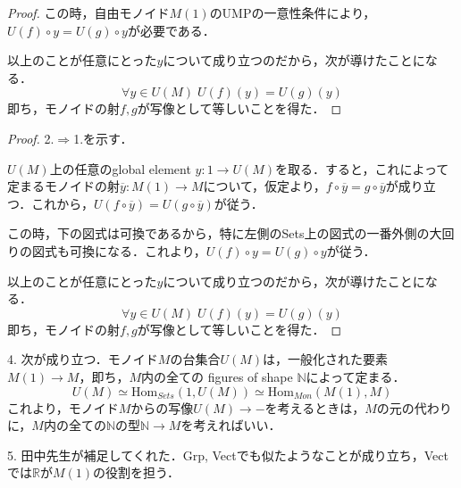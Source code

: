 \documentclass[uplatex, dvipdfmx]{jsarticle}
\begin{document}
\begin{example}
\begin{proof}
        この時，自由モノイド$M(1)$のUMPの一意性条件により，$U(f)\circ y=U(g)\circ y$が必要である．

        以上のことが任意にとった$y$について成り立つのだから，次が導けたことになる．
        \[\forall y\in U(M)\; U(f)(y)=U(g)(y) \]
        即ち，モノイドの射$f,g$が写像として等しいことを得た．
    \end{proof}
    \begin{proof}
        2.$\Rightarrow$1.を示す．
        
        $U(M)$上の任意のglobal element $y:1\to U(M)$を取る．すると，これによって定まるモノイドの射$\overline{y}:M(1)\to M$について，仮定より，$f\circ \overline{y}=g\circ\overline{y}$が成り立つ．これから，$U(f\circ\overline{y})=U(g\circ\overline{y})$が従う．
        
        この時，下の図式は可換であるから，特に左側のSets上の図式の一番外側の大回りの図式も可換になる．これより，$U(f)\circ y=U(g)\circ y$が従う．
        \begin{center}
        \end{center}

        以上のことが任意にとった$y$について成り立つのだから，次が導けたことになる．
        \[\forall y\in U(M)\; U(f)(y)=U(g)(y) \]
        即ち，モノイドの射$f,g$が写像として等しいことを得た．
    \end{proof}

    4. 次が成り立つ．モノイド$M$の台集合$U(M)$は，一般化された要素$M(1)\to M$，即ち，$M$内の全ての figures of shape $\mathbb{N}$によって定まる．
    \[ U(M)\simeq \mathrm{Hom}_{Sets}(1,U(M))\simeq \mathrm{Hom}_{Mon}(M(1),M) \]
    これより，モノイド$M$からの写像$U(M)\to -$を考えるときは，$M$の元の代わりに，$M$内の全ての$\mathbb{N}$の型$\mathbb{N}\to M$を考えればいい．

    5. 田中先生が補足してくれた．Grp, Vectでも似たようなことが成り立ち，Vectでは$\mathbb{R}$が$M(1)$の役割を担う．
\end{example}
\end{document}
